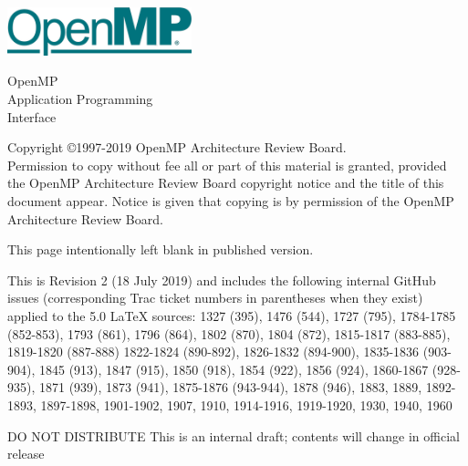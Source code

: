 
  \begin{titlepage}
    \begin{flushleft}
     \hspace{-6em} \includegraphics[width=0.4\textwidth]{openmp-logo.png}
    \end{flushleft}

    \begin{adjustwidth}{-0.75in}{0in}
    \begin{center}
      \Huge
      \textsf{OpenMP\\Application Programming\\Interface}

      \vspace{0.5in}\textsf{    }\vspace{-0.7in}
      \normalsize

      \vspace{1.0in}

      \textbf{\ompversion{}}
    \end{center}
    \end{adjustwidth}

    \vspace{3.0in}

\begin{adjustwidth}{0pt}{1em}\setlength{\parskip}{0.25\baselineskip}%
Copyright \copyright 1997-2019 OpenMP Architecture Review Board.\\
Permission to copy without fee all or part of this material is granted,
provided the OpenMP Architecture Review Board copyright notice and
the title of this document appear. Notice is given that copying is by
permission of the OpenMP Architecture Review Board.\end{adjustwidth}

  \end{titlepage}


\clearpage
\thispagestyle{empty}
\phantom{a}
This page intentionally left blank in published version.

This is Revision 2 (18 July 2019) and includes the following internal 
GitHub issues (corresponding Trac ticket numbers in parentheses when
they exist) applied to the 5.0 LaTeX sources: 1327 (395), 1476 (544), 
1727 (795), 1784-1785 (852-853), 1793 (861), 1796 (864), 1802 (870), 
1804 (872), 1815-1817 (883-885), 1819-1820 (887-888) 1822-1824 (890-892), 
1826-1832 (894-900), 1835-1836 (903-904), 1845 (913), 1847 (915), 1850 (918), 
1854 (922), 1856 (924), 1860-1867 (928-935), 1871 (939), 1873 (941), 
1875-1876 (943-944), 1878 (946), 1883, 1889, 1892-1893, 1897-1898, 
1901-1902, 1907, 1910, 1914-1916, 1919-1920, 1930, 1940, 1960

DO NOT DISTRIBUTE
This is an internal draft; contents will change in official release

\vfill


